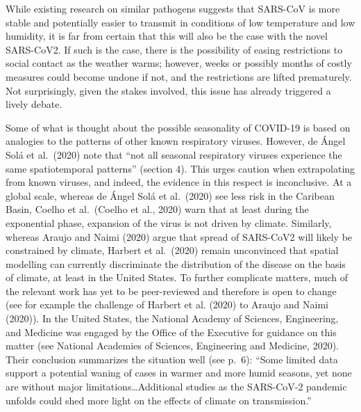 \documentclass[]{elsarticle} %
\begin{document}
While existing research on similar pathogens suggests that SARS-CoV is
more stable and potentially easier to transmit in conditions of low
temperature and low humidity, it is far from certain that this will also
be the case with the novel SARS-CoV2. If such is the case, there is the
possibility of easing restrictions to social contact as the weather
warms; however, weeks or possibly months of costly measures could become
undone if not, and the restrictions are lifted prematurely. Not
surprisingly, given the stakes involved, this issue has already
triggered a lively debate.

Some of what is thought about the possible seasonality of COVID-19 is
based on analogies to the patterns of other known respiratory viruses.
However, de Ángel Solá et al.~(2020) note that ``not all seasonal
respiratory viruses experience the same spatiotemporal patterns''
(section 4). This urges caution when extrapolating from known viruses,
and indeed, the evidence in this respect is inconclusive. At a global
scale, whereas de Ángel Solá et al.~(2020) see less risk in the Caribean
Basin, Coelho et al.~(Coelho et al., 2020) warn that at least during the
exponential phase, expansion of the virus is not driven by climate.
Similarly, whereas Araujo and Naimi (2020) argue that spread of
SARS-CoV2 will likely be constrained by climate, Harbert et al.~(2020)
remain unconvinced that spatial modelling can currently discriminate the
distribution of the disease on the basis of climate, at least in the
United States. To further complicate matters, much of the relevant work
has yet to be peer-reviewed and therefore is open to change (see for
example the challenge of Harbert et al. (2020) to Araujo and Naimi
(2020)). In the United States, the National Academy of Sciences,
Engineering, and Medicine was engaged by the Office of the Executive for
guidance on this matter (see National Academies of Sciences, Engineering
and Medicine, 2020). Their conclusion summarizes the situation well (see
p.~6): ``Some limited data support a potential waning of cases in warmer
and more humid seasons, yet none are without major
limitations\ldots Additional studies as the SARS-CoV-2 pandemic unfolds
could shed more light on the effects of climate on transmission.''
\end{document}
